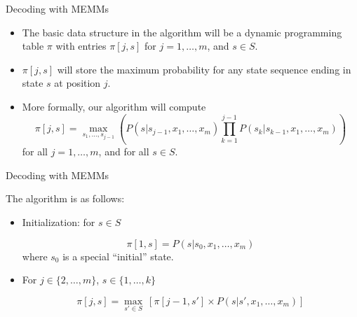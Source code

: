 \documentclass[handout]{beamer}
\begin{document}
\begin{frame}{Decoding with MEMMs}
\begin{scriptsize}
\begin{itemize}

\item The basic data structure in the algorithm will be a dynamic programming table $\pi$ with entries $\pi[j,s]$ for $j=1, \dots, m$, and $s \in S$.

\item  $\pi[j,s]$ will store the maximum probability for any state sequence ending in state $s$ at position $j$.

\item More formally, our algorithm will compute 
\begin{displaymath}
\pi[j,s] =  \max_{s_1,\dots, s_{j-1}}\left(P(s | s_{j-1}, x_1, \dots, x_m) \prod_{k=1}^{j-1}    P(s_k | s_{k-1}, x_1, \dots, x_m)\right)
\end{displaymath}
for all $j = 1, \dots,m$, and for all $s \in S$.

\end{itemize}


\end{scriptsize}
\end{frame}




\begin{frame}{Decoding with MEMMs}
\begin{scriptsize}
The algorithm is as follows:

\begin{itemize}

\item  Initialization: for $s \in  S$

\begin{displaymath}
  \pi[1,s] = P (s | s_0,x_1,\dots,x_m)
\end{displaymath}
where $s_0$ is a special ``initial'' state.

\item For $j \in \{2,\dots,m\}$, $s \in  \{1,\dots,k\}$

\begin{displaymath}
  \pi[j,s] =  \max_{s' \in S} \ [\pi[j-1,s'] \times P (s | s',x_1,\dots,x_m)]
\end{displaymath}

\end{itemize}



\end{scriptsize}
\end{frame}
\end{document}
